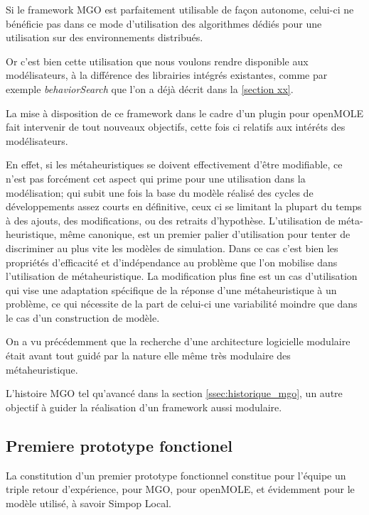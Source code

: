 Si le framework MGO est parfaitement utilisable de façon autonome, celui-ci ne bénéficie pas dans ce mode d'utilisation des algorithmes dédiés pour une utilisation sur des environnements distribués.

Or c'est bien cette utilisation que nous voulons rendre disponible aux modélisateurs, à la différence des librairies intégrés existantes, comme par exemple \textit{behaviorSearch} que l'on a déjà décrit dans la \ref{section xx}.


La mise à disposition de ce framework dans le cadre d'un plugin pour openMOLE fait intervenir de tout nouveaux objectifs, cette fois ci relatifs aux intéréts des modélisateurs.

En effet, si les métaheuristiques se doivent effectivement d'être modifiable, ce n'est pas forcément cet aspect qui prime pour une utilisation dans la modélisation; qui subit une fois la base du modèle réalisé des cycles de développements assez courts en définitive, ceux ci se limitant la plupart du temps à des ajouts, des modifications, ou des retraits d'hypothèse. L'utilisation de méta-heuristique, même canonique, est un premier palier d'utilisation pour tenter de discriminer au plus vite les modèles de simulation. Dans ce cas c'est bien les propriétés d'efficacité et d'indépendance au problème que l'on mobilise dans l'utilisation de métaheuristique. La modification plus fine est un cas d'utilisation qui vise une adaptation spécifique de la réponse d'une métaheuristique à un problème, ce qui nécessite de la part de celui-ci une variabilité moindre que dans le cas d'un construction de modèle.


On a vu précédemment que la recherche d'une architecture logicielle modulaire était avant tout guidé par la nature elle même très modulaire des métaheuristique.



L'histoire MGO tel qu'avancé dans la section \ref{ssec:historique_mgo}, un autre objectif à guider la réalisation d'un framework aussi modulaire.


\subsection{Premiere prototype fonctionel}
\label{p:prototype_fonctionel}

La constitution d'un premier prototype fonctionnel constitue pour l'équipe un triple retour d'expérience, pour MGO, pour openMOLE, et évidemment pour le modèle utilisé, à savoir Simpop Local.

